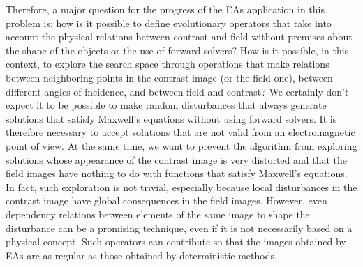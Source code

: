 			Therefore, a major question for the progress of the EAs application in this problem is: how is it possible to define evolutionary operators that take into account the physical relations between contrast and field without premises about the shape of the objects or the use of forward solvers? How is it possible, in this context, to explore the search space through operations that make relations between neighboring points in the contrast image (or the field one), between different angles of incidence, and between field and contrast? We certainly don't expect it to be possible to make random disturbances that always generate solutions that satisfy Maxwell's equations without using forward solvers. It is therefore necessary to accept solutions that are not valid from an electromagnetic point of view. At the same time, we want to prevent the algorithm from exploring solutions whose appearance of the contrast image is very distorted and that the field images have nothing to do with functions that satisfy Maxwell's equations. In fact, such exploration is not trivial, especially because local disturbances in the contrast image have global consequences in the field images. However, even dependency relations between elements of the same image to shape the disturbance can be a promising technique, even if it is not necessarily based on a physical concept. Such operators can contribute so that the images obtained by EAs are as regular as those obtained by deterministic methods.
			
